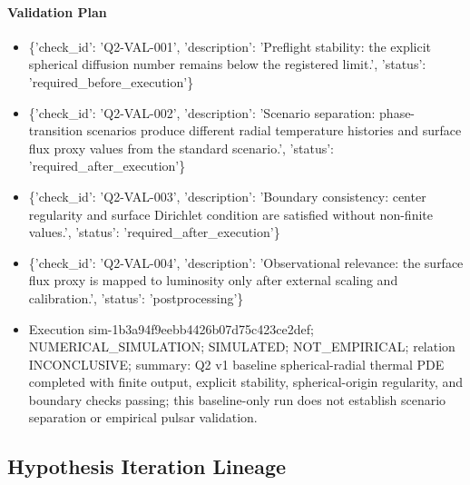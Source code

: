 \documentclass[11pt]{article}
\begin{document}
\paragraph{Validation Plan}
\begin{itemize}\raggedright
\item \{'check\_\allowbreak{}id': 'Q2-VAL-001', 'description': 'Preflight stability: the explicit spherical diffusion number remains below the registered limit.', 'status': 'required\_\allowbreak{}before\_\allowbreak{}execution'\}
\item \{'check\_\allowbreak{}id': 'Q2-VAL-002', 'description': 'Scenario separation: phase-transition scenarios produce different radial temperature histories and surface flux proxy values from the standard scenario.', 'status': 'required\_\allowbreak{}after\_\allowbreak{}execution'\}
\item \{'check\_\allowbreak{}id': 'Q2-VAL-003', 'description': 'Boundary consistency: center regularity and surface Dirichlet condition are satisfied without non-finite values.', 'status': 'required\_\allowbreak{}after\_\allowbreak{}execution'\}
\item \{'check\_\allowbreak{}id': 'Q2-VAL-004', 'description': 'Observational relevance: the surface flux proxy is mapped to luminosity only after external scaling and calibration.', 'status': 'postprocessing'\}
\end{itemize}

\begin{itemize}
\item Execution sim-1b3a94f9eebb4426b07d75c423ce2def; NUMERICAL\_SIMULATION; SIMULATED; NOT\_EMPIRICAL; relation INCONCLUSIVE; summary: Q2 v1 baseline spherical-radial thermal PDE completed with finite output, explicit stability, spherical-origin regularity, and boundary checks passing; this baseline-only run does not establish scenario separation or empirical pulsar validation.
\end{itemize}

\subsection{Hypothesis Iteration Lineage}
\end{document}
